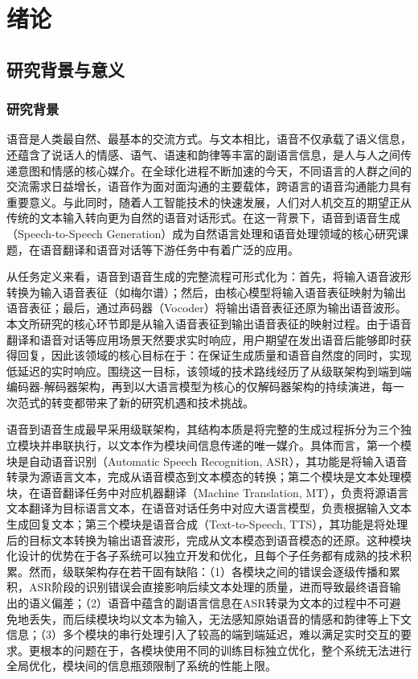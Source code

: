 \chapter{绪论}\label{chap:introduction}

\section{研究背景与意义}

\subsection{研究背景}

语音是人类最自然、最基本的交流方式。与文本相比，语音不仅承载了语义信息，还蕴含了说话人的情感、语气、语速和韵律等丰富的副语言信息，是人与人之间传递意图和情感的核心媒介。在全球化进程不断加速的今天，不同语言的人群之间的交流需求日益增长，语音作为面对面沟通的主要载体，跨语言的语音沟通能力具有重要意义。与此同时，随着人工智能技术的快速发展，人们对人机交互的期望正从传统的文本输入转向更为自然的语音对话形式。在这一背景下，语音到语音生成（Speech-to-Speech Generation）成为自然语言处理和语音处理领域的核心研究课题，在语音翻译和语音对话等下游任务中有着广泛的应用。

从任务定义来看，语音到语音生成的完整流程可形式化为：首先，将输入语音波形转换为输入语音表征（如梅尔谱）；然后，由核心模型将输入语音表征映射为输出语音表征；最后，通过声码器（Vocoder）将输出语音表征还原为输出语音波形。本文所研究的核心环节即是从输入语音表征到输出语音表征的映射过程。由于语音翻译和语音对话等应用场景天然要求实时响应，用户期望在发出语音后能够即时获得回复，因此该领域的核心目标在于：在保证生成质量和语音自然度的同时，实现低延迟的实时响应。围绕这一目标，该领域的技术路线经历了从级联架构到端到端编码器-解码器架构，再到以大语言模型为核心的仅解码器架构的持续演进，每一次范式的转变都带来了新的研究机遇和技术挑战。

语音到语音生成最早采用级联架构\citep{wang1998spoken,zong1999spoken,ney1999speech,lavie1997janus,nakamura2006atr}，其结构本质是将完整的生成过程拆分为三个独立模块并串联执行，以文本作为模块间信息传递的唯一媒介。具体而言，第一个模块是自动语音识别（Automatic Speech Recognition, ASR），其功能是将输入语音转录为源语言文本，完成从语音模态到文本模态的转换；第二个模块是文本处理模块，在语音翻译任务中对应机器翻译（Machine Translation, MT）\citep{liu2017nmt,li2018nmt,feng2020nmt}，负责将源语言文本翻译为目标语言文本，在语音对话任务中对应大语言模型\citep{che2023llm}，负责根据输入文本生成回复文本；第三个模块是语音合成（Text-to-Speech, TTS），其功能是将处理后的目标文本转换为输出语音波形，完成从文本模态到语音模态的还原。这种模块化设计的优势在于各子系统可以独立开发和优化，且每个子任务都有成熟的技术积累。然而，级联架构存在若干固有缺陷：（1）各模块之间的错误会逐级传播和累积，ASR阶段的识别错误会直接影响后续文本处理的质量，进而导致最终语音输出的语义偏差；（2）语音中蕴含的副语言信息在ASR转录为文本的过程中不可避免地丢失，而后续模块均以文本为输入，无法感知原始语音的情感和韵律等上下文信息；（3）多个模块的串行处理引入了较高的端到端延迟，难以满足实时交互的要求。更根本的问题在于，各模块使用不同的训练目标独立优化，整个系统无法进行全局优化，模块间的信息瓶颈限制了系统的性能上限。

